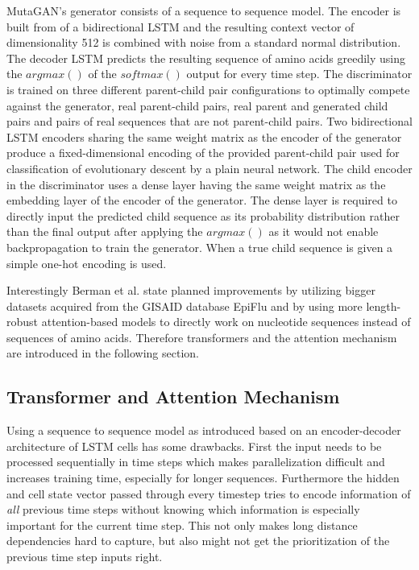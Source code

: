 MutaGAN's generator consists of a sequence to sequence model. The encoder is built from of a bidirectional \ac{LSTM} and the resulting context vector of dimensionality 512 is combined with noise from a standard normal dis\-tri\-bu\-ti\-on. The decoder \ac{LSTM} predicts the resulting sequence of amino acids greedily using the $argmax()$ of the $softmax()$ output for every time step. The discriminator is trained on three different parent-child pair configurations to optimally compete against the generator, real parent-child pairs, real parent and generated child pairs and pairs of real sequences that are not parent-child pairs. Two bidirectional \ac{LSTM} encoders sharing the same weight matrix as the encoder of the generator produce a fixed-dimensional encoding of the provided parent-child pair used for classification of evolutionary descent by a plain neural network. The child encoder in the discriminator uses a dense layer having the same weight matrix as the embedding layer of the encoder of the generator. The dense layer is required to directly input the predicted child sequence as its probability distribution rather than the final output after applying the $argmax()$ as it would not enable backpropagation to train the generator. When a true child sequence is given a simple one-hot encoding is used. \cite{Berman2020}

Interestingly Berman et al. \cite{Berman2020} state planned improvements by utilizing bigger datasets acquired from the \ac{GISAID} database EpiFlu and by using more length-robust attention-based models to directly work on nucleotide sequences instead of sequences of amino acids. Therefore transformers and the attention mechanism are introduced in the following section.

\subsection{Transformer and Attention Mechanism} \label{fundamentalsG}

Using a sequence to sequence model as introduced based on an encoder-decoder architecture of \ac{LSTM} cells has some drawbacks. First the input needs to be processed sequentially in time steps which makes parallelization difficult and increases training time, especially for longer sequences. Fur\-ther\-mo\-re the hidden and cell state vector passed through every timestep tries to encode information of \textit{all} previous time steps without knowing which information is especially important for the current time step. This not only makes long distance dependencies hard to capture, but also might not get the prioritization of the previous time step inputs right.  \cite{Bahdanau2016, Vaswani2017} 

